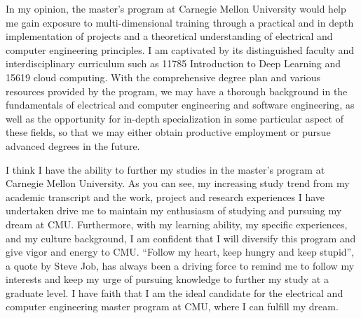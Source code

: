 \documentclass[16pt，letterpaper]{ctexart}
\begin{document}
In my opinion, the master’s program at Carnegie Mellon University would help me gain exposure to multi-dimensional training through a practical and in depth implementation of projects and a theoretical understanding of electrical and computer engineering principles. I am captivated by its distinguished faculty and interdisciplinary curriculum such as 11785 Introduction to Deep Learning and 15619 cloud computing. With the comprehensive degree plan and various resources provided by the program, we may have a thorough background in the fundamentals of electrical and computer engineering and software engineering, as well as the opportunity for in-depth specialization in some particular aspect of these fields, so that we may either obtain productive employment or pursue advanced degrees in the future.

I think I have the ability to further my studies in the master’s program at Carnegie Mellon University. As you can see, my increasing study trend from my academic transcript and the work, project and research experiences I have undertaken drive me to maintain my enthusiasm of studying and pursuing my dream at CMU. Furthermore, with my learning ability, my specific experiences, and my culture background, I am confident that I will diversify this program and give vigor and energy to CMU. “Follow my heart, keep hungry and keep stupid”, a quote by Steve Job, has always been a driving force to remind me to follow my interests and keep my urge of pursuing knowledge to further my study at a graduate level. I have faith that I am the ideal candidate for the electrical and computer engineering master program at CMU, where I can fulfill my dream.
\end{document}
